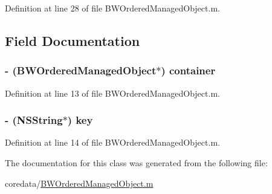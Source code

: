 Definition at line 28 of file BWOrderedManagedObject.m.



\subsection{Field Documentation}
\hypertarget{interface_b_w_ordered_value_proxy_a2263ab40e9161a0d5683cb27636d400c}{
\subsubsection[{container}]{\setlength{\rightskip}{0pt plus 5cm}-\/ ({\bf BWOrderedManagedObject}$\ast$) {\bf container}}}
\label{interface_b_w_ordered_value_proxy_a2263ab40e9161a0d5683cb27636d400c}


Definition at line 13 of file BWOrderedManagedObject.m.

\hypertarget{interface_b_w_ordered_value_proxy_a0b6a9866e1390620790387442c1fb8be}{
\subsubsection[{key}]{\setlength{\rightskip}{0pt plus 5cm}-\/ (NSString$\ast$) {\bf key}}}
\label{interface_b_w_ordered_value_proxy_a0b6a9866e1390620790387442c1fb8be}


Definition at line 14 of file BWOrderedManagedObject.m.



The documentation for this class was generated from the following file:\begin{DoxyCompactItemize}
\item 
coredata/\hyperlink{_b_w_ordered_managed_object_8m}{BWOrderedManagedObject.m}\end{DoxyCompactItemize}
